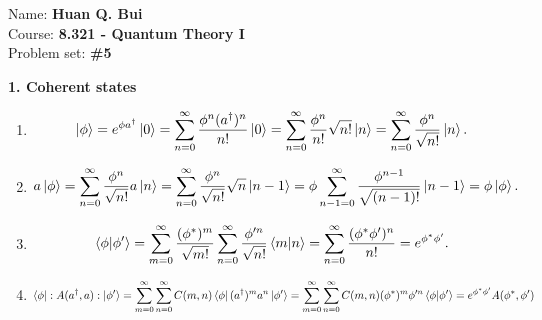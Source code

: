 \documentclass{article}
\theoremstyle{definition}
\newcommand{\f}[2]{\frac{#1}{#2}}
\begin{document}
\begin{framed}
\noindent Name: \textbf{Huan Q. Bui}\\
Course: \textbf{8.321 - Quantum Theory I}\\
Problem set: \textbf{\#5}
\end{framed}
	


\noindent \textbf{1. Coherent states}

\begin{enumerate}[label=(\alph*)]
	\item 
	\begin{align*}
	\ket{\phi} = e^{\phi a^\dagger }\ket{0} = \sum_{n=0}^\infty \f{\phi^n (a^\dagger)^n}{n!} \ket{0} 
	= \sum^\infty_{n=0} \f{\phi^n}{n!} \sqrt{n!} \ket{n} 
	= \sum^\infty_{n=0} \f{\phi^n}{\sqrt{n!}}\ket{n}.
	\end{align*}
	
	
	\item 
	\begin{align*}
	a\ket{\phi} = \sum^\infty_{n=0} \f{\phi^n}{\sqrt{n!}}a \ket{n} = \sum^\infty_{n=0} \f{\phi^n}{\sqrt{n!}}\sqrt{n} \ket{n-1} = \phi \sum^\infty_{n-1=0} \f{\phi^{n-1}}{\sqrt{(n-1)!}}\ket{n-1} = \phi \ket{\phi}. 
	\end{align*}
	
	\item 
	\begin{align*}
	\bra{\phi}\ket{\phi'} = \sum^\infty_{m=0} \f{(\phi^*)^m}{\sqrt{m!}} \sum^\infty_{n=0} \f{\phi'^n}{\sqrt{n!}}\bra{m}\ket{n} = \sum^\infty_{n=0} \f{(\phi^*\phi')^n}{n!} = e^{\phi^* \phi'}.
	\end{align*}
	
	\item 
	\begin{align*}
	\bra{\phi} : A(a^\dagger, a) : \ket{\phi'}
	=  \sum^{\infty}_{m=0}\sum^\infty_{n=0} C(m,n) \bra{\phi} (a^\dagger)^m a^n \ket{\phi'} 
	=  \sum^{\infty}_{m=0}\sum^\infty_{n=0} C(m,n) (\phi^*)^m \phi'^n \bra{\phi}\ket{\phi'} 
	=  e^{\phi^* \phi'} A(\phi^*, \phi')
	\end{align*}
	
	
	

\end{enumerate}
\end{document}
